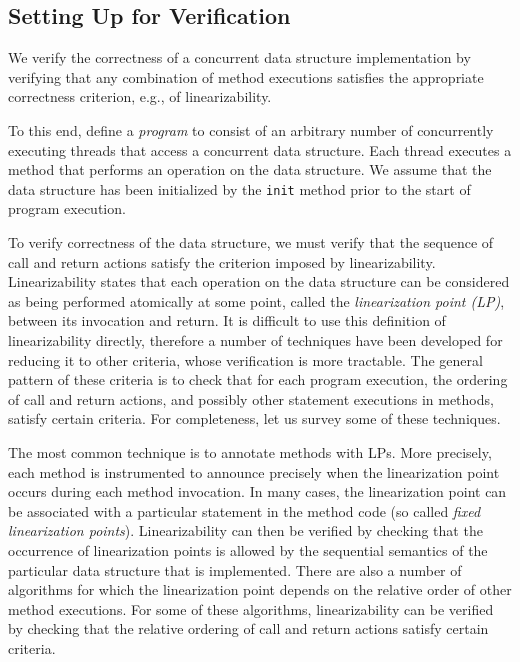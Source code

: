 \subsection{Setting Up for Verification}
We verify the correctness of a concurrent data structure implementation by
verifying that any combination of method executions satisfies the
appropriate correctness criterion, e.g., of linearizability.

To this end, define a {\em program} to consist 
of an arbitrary number of concurrently executing threads
that access a concurrent data structure.
%
Each thread executes a method that performs an operation
on the data structure. We assume that the data structure has been initialized
by the {\tt init} method prior to the start of program execution.

To verify correctness of the data structure, we must verify that the
sequence of call and return actions satisfy the criterion imposed by
linearizability. Linearizability states that each operation on the data
structure can be considered as being
performed atomically at some point, called the {\em linearization point (LP)},
between its invocation and return.
It is difficult to use this definition of linearizability directly, therefore
a number of techniques have been developed for reducing it to other criteria,
whose verification is more tractable. The general pattern of these criteria
is to check that for each program execution,
the ordering of call and return actions, and possibly other statement
executions in methods, satisfy certain criteria. For completeness, let us
survey some of these techniques.

The most common technique is to annotate methods with LPs. More precisely,
each method is instrumented to announce precisely when the linearization point
occurs during each method invocation. In many cases, the linearization point
can be associated with a particular statement in the method code (so called
{\em fixed linearization points}). Linearizability can then be verified by
checking that the occurrence of linearization points is allowed by the
sequential semantics of the particular data structure that is implemented.
There are also a number of
algorithms for which the linearization point depends on the relative order of
other method executions.
For some of these algorithms, linearizability can be verified by checking
that the relative ordering of call and return actions satisfy certain
criteria. 

